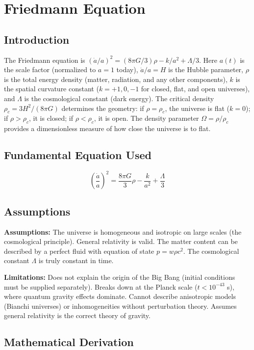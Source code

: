 \chapter{Friedmann Equation}

\section*{Introduction}

The Friedmann equation is $(\dot{a}/a)^2 = (8\pi G/3)\rho - k/a^2 + \Lambda/3$. Here $a(t)$ is the scale factor (normalized to $a = 1$ today), $\dot{a}/a = H$ is the Hubble parameter, $\rho$ is the total energy density (matter, radiation, and any other components), $k$ is the spatial curvature constant ($k = +1, 0, -1$ for closed, flat, and open universes), and $\Lambda$ is the cosmological constant (dark energy). The critical density $\rho_c = 3H^2/(8\pi G)$ determines the geometry: if $\rho = \rho_c$, the universe is flat ($k = 0$); if $\rho > \rho_c$, it is closed; if $\rho < \rho_c$, it is open. The density parameter $\Omega = \rho/\rho_c$ provides a dimensionless measure of how close the universe is to flat.
\section*{Fundamental Equation Used}

\[
\left(\frac{\dot{a}}{a}\right)^2 = \frac{8\pi G}{3}\rho - \frac{k}{a^2} + \frac{\Lambda}{3}
\]
\section*{Assumptions}

\textbf{Assumptions:} The universe is homogeneous and isotropic on large scales (the cosmological principle). General relativity is valid. The matter content can be described by a perfect fluid with equation of state $p = w\rho c^2$. The cosmological constant $\Lambda$ is truly constant in time.


\textbf{Limitations:} Does not explain the origin of the Big Bang (initial conditions must be supplied separately). Breaks down at the Planck scale ($t < 10^{-43}$ s), where quantum gravity effects dominate. Cannot describe anisotropic models (Bianchi universes) or inhomogeneities without perturbation theory. Assumes general relativity is the correct theory of gravity.


\section*{Mathematical Derivation}

